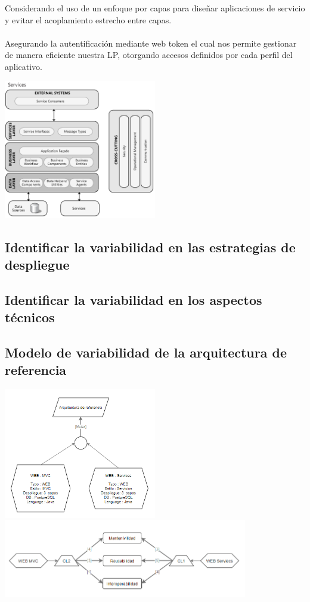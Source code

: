 \documentclass[10pt,a4paper,openany]{book}
\begin{document}
\begin{enumerate}
\begin{itemize}
	Considerando el uso de un enfoque por capas para diseñar aplicaciones de servicio y evitar el acoplamiento estrecho entre capas.\\\\
	Asegurando la autentificación mediante web token el cual nos permite gestionar de manera eficiente nuestra LP, otorgando accesos definidos por cada perfil del aplicativo.
\end{itemize}
\begin{center}
\includegraphics[width=0.5\textwidth]{arq2}
\end{center}
\end{enumerate}



\subsection{Identificar la variabilidad en las estrategias de despliegue}
\subsection{Identificar la variabilidad en los aspectos técnicos}
\subsection{Modelo de variabilidad de la arquitectura de referencia}
\begin{center}
\includegraphics[width=0.5\textwidth]{model1}\\
\includegraphics[width=0.8\textwidth]{model2}
\end{center}
\end{document}
